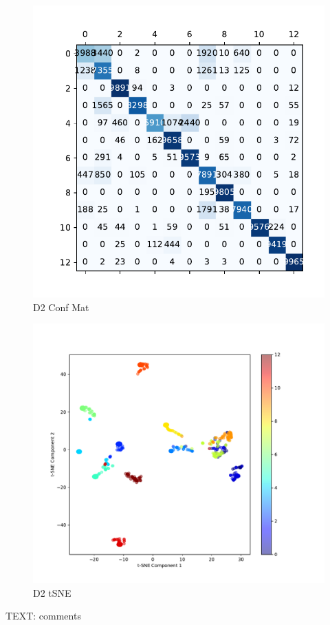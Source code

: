 \documentclass{article}
\begin{document}
	\begin{figure}[htbp]
		\centering
		\includegraphics[width=\linewidth]{Figs/diagnosis2_confusion_matrix.pdf}
		\caption{D2 Conf Mat}
		\vspace{0.3cm}
		\label{fig:D2_conf_mat}
	\end{figure}
	\begin{figure}[htbp]
		\centering
		\includegraphics[width=\linewidth]{Figs/diagnosis2_tSNE.pdf}
		\caption{D2 tSNE}
		\vspace{0.3cm}
		\label{fig:D2_tSNE}
	\end{figure}
	TEXT: comments
	
\end{document}
